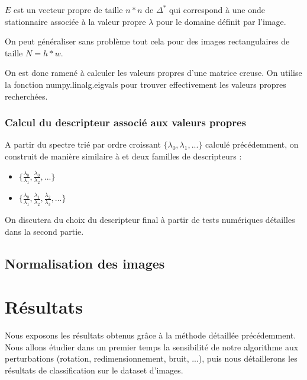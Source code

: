 \documentclass[a4paper,10pt]{article} %
\theoremstyle{definition} %
\begin{document}
  $E$ est un vecteur propre de taille $n*n$  de $\Delta^*$ qui correspond à une onde stationnaire associée à la valeur propre $\lambda$ pour le domaine définit par l'image.
  
  On peut généraliser sans problème tout cela pour des images rectangulaires de taille $N = h*w$.
  
  On est donc ramené à calculer les valeurs propres d'une matrice creuse. On utilise la fonction numpy.linalg.eigvals pour trouver effectivement les valeurs propres recherchées.
  
  
  \subsubsection*{Calcul du descripteur associé aux valeurs propres}


A partir du spectre trié par ordre croissant $\{\lambda_0, \lambda_1, ...\}$ calculé précédemment, on construit de manière similaire à \cite{Zuliani04} et \cite{KhabouHR07} deux familles de descripteurs : 
\begin{itemize}
\item $\{\frac{\lambda_0}{\lambda_1}, \frac{\lambda_0}{\lambda_2}, ... \}$
\item $\{\frac{\lambda_0}{\lambda_1}, \frac{\lambda_1}{\lambda_2}, \frac{\lambda_2}{\lambda_3},...\}$
\end{itemize}

On discutera du choix du descripteur final à partir de tests numériques détailles dans la second partie.
  
\subsection{Normalisation des images}



\section{Résultats}

Nous exposons les résultats obtenus grâce à la méthode détaillée précédemment. Nous allons étudier dans un premier temps la sensibilité de notre algorithme aux perturbations (rotation, redimensionnement, bruit, ...), puis nous détaillerons les résultats de classification sur le dataset d'images.
\end{document}
